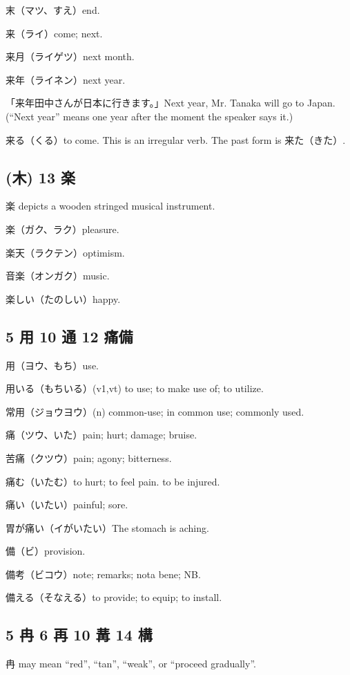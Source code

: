 末（マツ、すえ）end.

来（ライ）come; next.

来月（ライゲツ）next month.

来年（ライネン）next year.

「来年田中さんが日本に行きます。」Next year, Mr. Tanaka will go to Japan.
(``Next year'' means one year after the moment the speaker says it.)

来る（くる）to come.
This is an irregular verb.
The past form is 来た（きた）.

\subsection{(木) 13 楽}

楽 depicts a wooden stringed musical instrument.

楽（ガク、ラク）pleasure.

楽天（ラクテン）optimism.

音楽（オンガク）music.

楽しい（たのしい）happy.

\subsection{5 用 10 通 12 痛備}

用（ヨウ、もち）use.

用いる（もちいる）(v1,vt) to use; to make use of; to utilize.

常用（ジョウヨウ）(n) common-use; in common use; commonly used.

痛（ツウ、いた）pain; hurt; damage; bruise.

苦痛（クツウ）pain; agony; bitterness.

痛む（いたむ）to hurt; to feel pain. to be injured.

痛い（いたい）painful; sore.

胃が痛い（イがいたい）The stomach is aching.

備（ビ）provision.

備考（ビコウ）note; remarks; nota bene; NB.

備える（そなえる）to provide; to equip; to install.

\subsection{5 冉 6 再 10 冓 14 構}

冉 may mean ``red'', ``tan'', ``weak'', or ``proceed gradually''.

